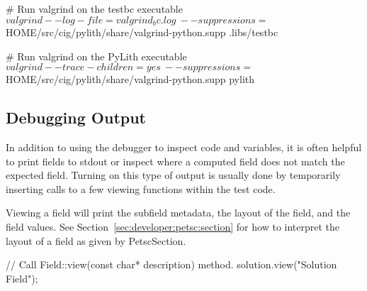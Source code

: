 \begin{shell}
# Run valgrind on the testbc executable
$ valgrind --log-file=valgrind_bc.log \
  --suppressions=$HOME/src/cig/pylith/share/valgrind-python.supp .libs/testbc

# Run valgrind on the PyLith executable
$ valgrind --trace-children=yes \
  --suppressions=$HOME/src/cig/pylith/share/valgrind-python.supp pylith
\end{shell}

\subsection{Debugging Output}

In addition to using the debugger to inspect code and variables, it is often helpful to print fields to stdout or
inspect where a computed field does not match the expected field. Turning on this type of output is usually done by
temporarily inserting calls to a few viewing functions within the test code.

Viewing a field will print the subfield metadata, the layout of the field, and the field values. See
Section~\vref{sec:developer:petsc:section} for how to interpret the layout of a field as given by PetscSection.

\begin{cplusplus}
// Call Field::view(const char* description) method.
solution.view("Solution Field");
\end{cplusplus}

